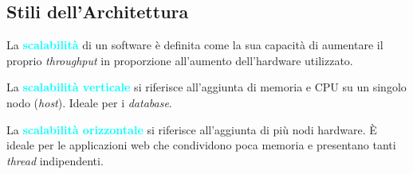 \subsection{Stili dell'Architettura}

\begin{definition}[Scalabilità]
    La \textbf{\textcolor{cyan}{scalabilità}} di un software è definita come la sua capacità di aumentare
    il proprio \emph{throughput} in proporzione all'aumento dell'hardware utilizzato.
\end{definition}

\begin{definition}
    La \textbf{\textcolor{cyan}{scalabilità verticale}} si riferisce all'aggiunta di memoria e CPU su un singolo nodo (\emph{host}). Ideale per i \emph{database}.
\end{definition}

\begin{definition}
    La \textbf{\textcolor{cyan}{scalabilità orizzontale}} si riferisce all'aggiunta di più nodi hardware. È ideale per le applicazioni web che condividono poca memoria
    e presentano tanti \emph{thread} indipendenti.
\end{definition}

